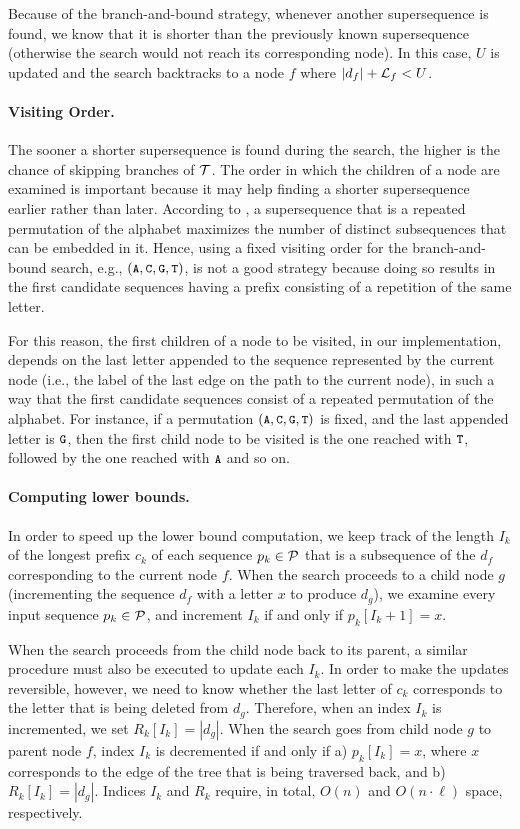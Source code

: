 Because of the branch-and-bound strategy, whenever another supersequence is
found, we know that it is shorter than the previously known supersequence
(otherwise the search would not reach its corresponding node). In this case, $U$
is updated and the search backtracks to a node $f$ where $|d_f| + {\mathcal{L}}_f < U$.

\paragraph{Visiting Order.} The sooner a shorter supersequence is found during
the search, the higher is the chance of skipping branches of ${\mathcal{T}}$. The order
in which the children of a node are examined is important because it may help
finding a shorter supersequence earlier rather than later. According to
\citet{Chase1976}, a supersequence that is a repeated permutation of the
alphabet maximizes the number of distinct subsequences that can be embedded in
it. Hence, using a fixed visiting order for the branch-and-bound search, e.g.,
$(\text{\small{\tt A}}, \text{\small{\tt C}}, \text{\small{\tt G}}, \text{\small{\tt T}})$, is not a good strategy because doing so results in the
first candidate sequences having a prefix consisting of a repetition of the
same letter.

For this reason, the first children of a node to be visited, in our
implementation, depends on the last letter appended to the sequence represented
by the current node (i.e., the label of the last edge on the path to the current
node), in such a way that the first candidate sequences consist of a repeated
permutation of the alphabet. For instance, if a permutation $(\text{\small{\tt A}},\text{\small{\tt C}},\text{\small{\tt G}},\text{\small{\tt T}})$
is fixed, and the last appended letter is $\text{\small{\tt G}}$, then the first child node to
be visited is the one reached with $\text{\small{\tt T}}$, followed by the one reached with $\text{\small{\tt A}}$
and so on.

\paragraph{Computing lower bounds.} 
In order to speed up the lower bound computation, we keep track of the length
$I_k$ of the longest prefix $c_k$ of each sequence $p_k \in {\mathcal{P}}$ that is a
subsequence of the $d_f$ corresponding to the current node $f$. When the search
proceeds to a child node $g$ (incrementing the sequence $d_f$ with a letter $x$
to produce $d_g$), we examine every input sequence $p_k \in {\mathcal{P}}$, and
increment $I_k$ if and only if $p_k[I_k + 1] = x$.

When the search proceeds from the child node back to its parent, a similar
procedure must also be executed to update each $I_k$. In order to make the
updates reversible, however, we need to know whether the last letter of $c_k$
corresponds to the letter that is being deleted from $d_g$. Therefore, when an
index $I_k$ is incremented, we set $R_k[I_k] = |d_g|$. When the search goes from
child node $g$ to parent node $f$, index $I_k$ is decremented if and only if a)
$p_k[I_k] = x$, where $x$ corresponds to the edge of the tree that is being
traversed back, and b) $R_k[I_k] = |d_g|$. Indices $I_k$ and $R_k$ require, in
total, $O(n)$ and $O(n \cdot \ell)$ space, respectively.

